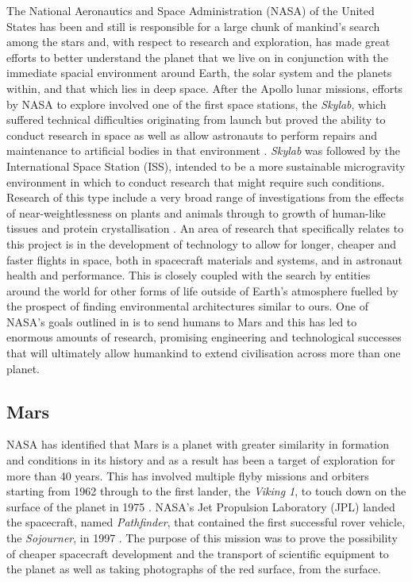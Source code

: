       The National Aeronautics and Space Administration (NASA) of the United States has been and still is responsible for a large chunk of mankind's search among the stars and, with respect to research and exploration, has made great efforts to better understand the planet that we live on in conjunction with the immediate spacial environment around Earth, the solar system and the planets within, and that which lies in deep space. After the Apollo lunar missions, efforts by NASA to explore involved one of the first space stations, the \textit{Skylab}, which suffered technical difficulties originating from launch but proved the ability to conduct research in space as well as allow astronauts to perform repairs and maintenance to artificial bodies in that environment \cite{compton1983living}. \textit{Skylab} was followed by the International Space Station (ISS), intended to be a more sustainable microgravity environment in which to conduct research that might require such conditions. Research of this type include a very broad range of investigations from the effects of near-weightlessness on plants and animals through to growth of human-like tissues and protein crystallisation \cite{nasaresearch}. An area of research that specifically relates to this project is in the development of technology to allow for longer, cheaper and faster flights in space, both in spacecraft materials and systems, and in astronaut health and performance. This is closely coupled with the search by entities around the world for other forms of life outside of Earth's atmosphere fuelled by the prospect of finding environmental architectures similar to ours. One of NASA's goals outlined in \cite{nasa2010act} is to send humans to Mars and this has led to enormous amounts of research, promising engineering and technological successes that will ultimately allow humankind to extend civilisation across more than one planet.
    
    \subsection{Mars} 
      NASA has identified that Mars is a planet with greater similarity in formation and conditions in its history and as a result has been a target of exploration for more than 40 years. This has involved multiple flyby missions and orbiters starting from 1962 through to the first lander, the \textit{Viking 1}, to touch down on the surface of the planet in 1975 \cite{marsprogram2008}. NASA's Jet Propulsion Laboratory (JPL) landed the spacecraft, named \textit{Pathfinder}, that contained the first successful rover vehicle, the \textit{Sojourner}, in 1997 \cite{pathfindersojournerjpl}. The purpose of this mission was to prove the possibility of cheaper spacecraft development and the transport of scientific equipment to the planet as well as taking photographs of the red surface, from the surface. 
        
